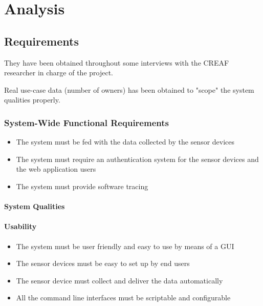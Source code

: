 \chapter{Analysis}

\section{Requirements}
They have been obtained throughout some interviews with the CREAF researcher in charge of the project.

Real use-case data (number of owners) has been obtained to "scope" the system qualities properly.

\subsection{System-Wide Functional Requirements}

\begin{itemize}
	\item The system must be fed with the data collected by the sensor devices
	\item The system must require an authentication system for the sensor devices and the web application users
	\item The system must provide software tracing
\end{itemize}

\subsubsection{System Qualities}

\subsubsection{Usability}

\begin{itemize}
	\item The system must be user friendly and easy to use by means of a GUI
	\item The sensor devices must be easy to set up by end users
	\item The sensor device must collect and deliver the data automatically
	\item All the command line interfaces must be scriptable and configurable
\end{itemize}

